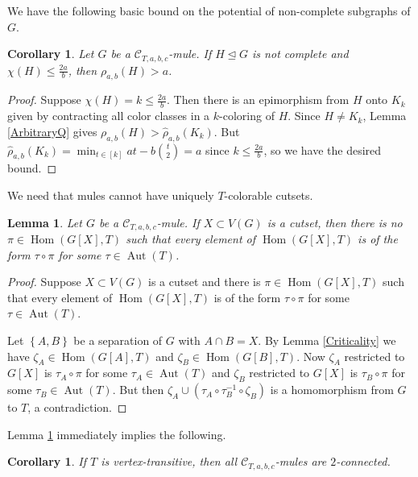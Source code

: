 \documentclass[12pt]{amsart}
\theoremstyle{plain}
\newtheorem{lem}[thm]{Lemma}
\newtheorem{cor}[thm]{Corollary}
\theoremstyle{definition}
\theoremstyle{remark}
\newcommand{\fancy}[1]{\mathcal{#1}}
\newcommand{\C}{\fancy{C}}
\newcommand{\set}[1]{\left\{ #1 \right\}}
\newcommand{\irange}[1]{\left[#1\right]}
\renewcommand{\hom}{\operatorname{Hom}}
\newcommand{\aut}{\operatorname{Aut}}
\begin{document}
We have the following basic bound on the potential of non-complete subgraphs of $G$.
\begin{cor}\label{CompleteQ}
Let $G$ be a $\C_{T,a,b,c}$-mule. If $H \unlhd G$ is not complete and $\chi(H) \le \frac{2a}{b}$, then $\rho_{a,b}(H) > a$.
\end{cor}
\begin{proof}
Suppose $\chi(H) = k \le \frac{2a}{b}$.  Then there is an epimorphism from $H$ onto $K_k$ given by contracting all color classes in a $k$-coloring of $H$.  Since $H \ne K_k$, Lemma \ref{ArbitraryQ} gives
$\rho_{a,b}(H) > \hat{\rho}_{a,b}(K_k)$.  But $\hat{\rho}_{a,b}(K_k) = \min_{t \in \irange{k}} at - b\binom{t}{2} = a$ since $k \le \frac{2a}{b}$, so we have the desired bound.
\end{proof}

We need that mules cannot have uniquely $T$-colorable cutsets.
\begin{lem}\label{UniquelyColorable}
Let $G$ be a $\C_{T,a,b,c}$-mule.  If $X \subset V(G)$ is a cutset, then there is no $\pi \in \hom(G[X], T)$ such that every element of $\hom(G[X], T)$ is of the form $\tau \circ \pi$ for some $\tau \in \aut(T)$. 
\end{lem}
\begin{proof}
Suppose $X \subset V(G)$ is a cutset and there is $\pi \in \hom(G[X], T)$ such that every element of $\hom(G[X], T)$ is of the form $\tau \circ \pi$ for some $\tau \in \aut(T)$.   

Let $\set{A,B}$ be a separation of $G$ with $A \cap B = X$.  By Lemma \ref{Criticality} we have $\zeta_A \in \hom(G[A], T)$ and $\zeta_B \in \hom(G[B], T)$.  Now $\zeta_A$ restricted to $G[X]$ is $\tau_A \circ \pi$ for some $\tau_A \in \aut(T)$ and $\zeta_B$ restricted to $G[X]$ is $\tau_B \circ \pi$ for some $\tau_B \in \aut(T)$.  But then $\zeta_A \cup (\tau_A \circ \tau_B^{-1} \circ \zeta_B)$ is a homomorphism from $G$ to $T$, a contradiction.
\end{proof}

Lemma \ref{UniquelyColorable} immediately implies the following.
\begin{cor}\label{TwoConnected}
If $T$ is vertex-transitive, then all $\C_{T,a,b,c}$-mules are $2$-connected. 
\end{cor}
\end{document}
